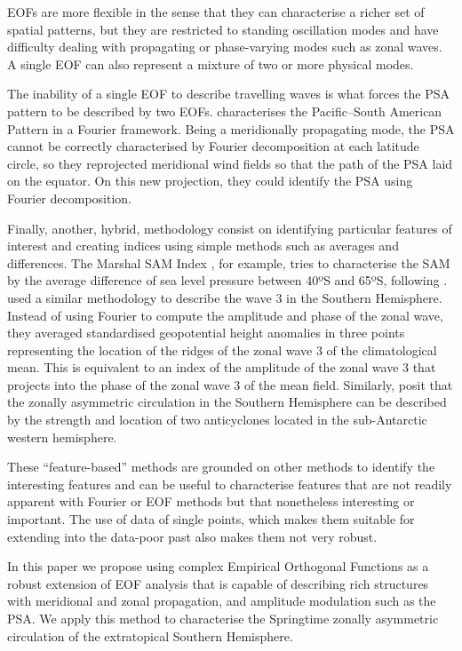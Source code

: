 \documentclass[smallextended]{svjour3}       %
\begin{document}
EOFs are more flexible in the sense that they can characterise a richer set of spatial patterns, but they are restricted to standing oscillation modes and have difficulty dealing with propagating or phase-varying modes such as zonal waves. A single EOF can also represent a mixture of two or more physical modes.

The inability of a single EOF to describe travelling waves is what forces the PSA pattern to be described by two EOFs. \citet{irving2016} characterises the Pacific--South American Pattern in a Fourier framework. Being a meridionally propagating mode, the PSA cannot be correctly characterised by Fourier decomposition at each latitude circle, so they reprojected meridional wind fields so that the path of the PSA laid on the equator. On this new projection, they could identify the PSA using Fourier decomposition.

Finally, another, hybrid, methodology consist on identifying particular features of interest and creating indices using simple methods such as averages and differences. The Marshal SAM Index \citep{marshall2003}, for example, tries to characterise the SAM by the average difference of sea level pressure between 40ºS and 65ºS, following \citet{gong1999}. \citet{raphael2004} used a similar methodology to describe the wave 3 in the Southern Hemisphere. Instead of using Fourier to compute the amplitude and phase of the zonal wave, they averaged standardised geopotential height anomalies in three points representing the location of the ridges of the zonal wave 3 of the climatological mean. This is equivalent to an index of the amplitude of the zonal wave 3 that projects into the phase of the zonal wave 3 of the mean field. Similarly, \citet{hobbs2010} posit that the zonally asymmetric circulation in the Southern Hemisphere can be described by the strength and location of two anticyclones located in the sub-Antarctic western hemisphere.

These ``feature-based'' methods are grounded on other methods to identify the interesting features and can be useful to characterise features that are not readily apparent with Fourier or EOF methods but that nonetheless interesting or important. The use of data of single points, which makes them suitable for extending into the data-poor past also makes them not very robust.

In this paper we propose using complex Empirical Orthogonal Functions \citep{horel1984} as a robust extension of EOF analysis that is capable of describing rich structures with meridional and zonal propagation, and amplitude modulation such as the PSA. We apply this method to characterise the Springtime zonally asymmetric circulation of the extratopical Southern Hemisphere.
\end{document}
